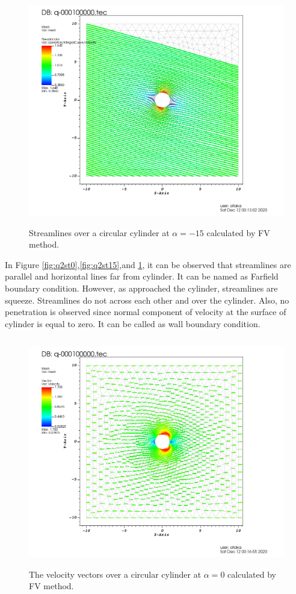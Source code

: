 \documentclass[letterpaper,12pt]{article}
\begin{document}
\begin{figure} [ht]
	\centering
	\includegraphics[height = 10cm]{graph/neg15deg/Cylinder_neg15angle_streamline0000.png}
	\caption{Streamlines over a circular cylinder at $\alpha=-15$ calculated by FV method.}
    \label{fig:q2st-15}
\end{figure}
In Figure \ref{fig:q2st0},\ref{fig:q2st15},and \ref{fig:q2st-15}, it can be observed that streamlines 
are parallel and horizontal lines far from cylinder. It can be named as Farfield boundary condition. 
However, as approached the cylinder, streamlines are squeeze. Streamlines do not across each other 
and over the cylinder. Also, no penetration is observed since normal component of velocity at the 
surface of cylinder is equal to zero. It can be called as wall boundary condition. 
\begin{figure} [ht]
	\centering
	\includegraphics[height = 10cm]{graph/0deg/Cylinder_0angle_vector0000.png}
	\caption{The velocity vectors over a circular cylinder at $\alpha=0$ calculated by FV method.}
    \label{fig:q2v0}
\end{figure}
\end{document}
